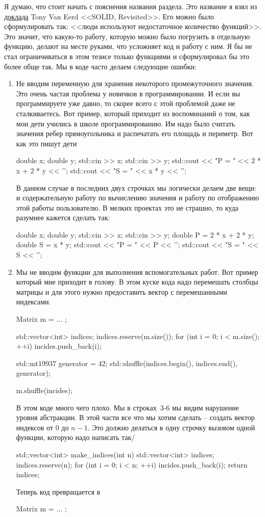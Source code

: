 Я думаю, что стоит начать с пояснения названия раздела.
Это название я взял из \href{https://youtu.be/glYq-dvgby4?si=NCKw80I6LdvJx4OR}{доклада} Tony Van Eerd <<SOLID, Revisited>>.
Его можно было сформулировать так: <<люди используют недостаточное количество функций>>.
Это значит, что какую-то работу, которую можно было погрузить в отдельную функцию, делают на месте руками, что усложняет код и работу с ним.
Я бы не стал ограничиваться в этом тезисе только функциями и сформулировал бы это более обще так.
Мы в коде часто делаем следующие ошибки:
\begin{enumerate}
\item Не вводим переменную для хранения некоторого промежуточного значения.
Это очень частая проблема у новичков в программировании.
И если вы программируете уже давно, то скорее всего с этой проблемой даже не сталкиваетесь.
Вот пример, который приходит из воспоминаний о том, как мои дети учились в школе программированию.
Им надо было считать значения ребер прямоугольника и распечатать его площадь и периметр.
Вот как это пишут дети
\begin{cppcode}
double x;
double y;
std::cin >> x;
std::cin >> y;
std::cout << "P = " << 2 * x + 2 * y << '\n';
std::cout << "S = " << x * y << '\n';
\end{cppcode}
В данном случае в последних двух строчках мы логически делаем две вещи: и содержательную работу по вычислению значения и работу по отображению этой работы пользователю.
В мелких проектах это не страшно, то куда разумнее кажется сделать так:
\begin{cppcode}
double x;
double y;
std::cin >> x;
std::cin >> y;
double P = 2 * x + 2 * y;
double S = x * y;
std::cout << "P = " << P << '\n';
std::cout << "S = " << S << '\n';
\end{cppcode}

\item Мы не вводим функции для выполнения вспомогательных работ.
Вот пример который мне приходит в голову.
В этом куске кода надо перемешать столбцы матрицы и для этого нужно предоставить вектор с перемешанными индексами.
\begin{cppcode}
Matrix m = ... ;

std::vector<int> indices;
indices.reserve(m.size());
for (int i = 0; i < m.size(); ++i)
  incides.push_back(i);

std::mt19937 generator = 42;
std::shuffle(indices.begin(), indices.end(), generator);

m.shuffle(incides);
\end{cppcode}
В этом коде много чего плохо.
Мы в строках~3-6 мы видим нарушение уровня абстракции.
В этой части все что мы хотим сделать -- создать вектор индексов от $0$ до $n-1$.
Это должно делаться в одну строчку вызовом одной функции, которую надо написать так/
\begin{cppcode}
std::vector<int> make_indices(int n) {
  std::vector<int> indices;
  indices.reserve(n);
  for (int i = 0; i < n; ++i)
    incides.push_back(i);
  return indices;
}
\end{cppcode}
Теперь код превращается в
\begin{cppcode}
Matrix m = ... ;


\end{cppcode}
\end{enumerate}
